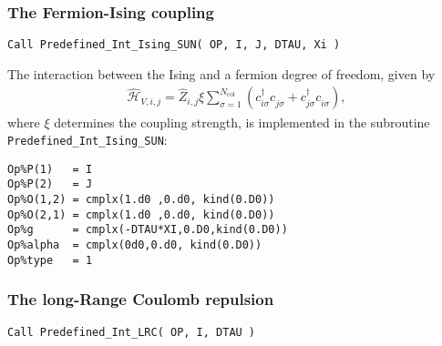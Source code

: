 \subsubsection{The Fermion-Ising coupling}

\begin{lstlisting}[style=fortran]
Call Predefined_Int_Ising_SUN( OP, I, J, DTAU, Xi )
\end{lstlisting}

The interaction between the Ising and a fermion degree of freedom, given by
\begin{align}
\hat{\mathcal{H}}_{V,i,j} =
\hat{Z}_{i,j} \xi  \sum_{\sigma=1}^{N_\mathrm{col}}\left( c^{\dagger}_{i \sigma} c^{\phantom\dagger}_{j \sigma} + c^{\dagger}_{j \sigma} c^{\phantom\dagger}_{i \sigma} \right),
\end{align} 
where $\xi$ determines the coupling strength, is implemented in the subroutine \texttt{Predefined\_Int\_Ising\_SUN}:
\begin{lstlisting}[style=fortran]
Op%P(1)   = I
Op%P(2)   = J
Op%O(1,2) = cmplx(1.d0 ,0.d0, kind(0.D0)) 
Op%O(2,1) = cmplx(1.d0 ,0.d0, kind(0.D0)) 
Op%g      = cmplx(-DTAU*XI,0.D0,kind(0.D0))
Op%alpha  = cmplx(0d0,0.d0, kind(0.D0)) 
Op%type   = 1

\end{lstlisting}



\subsubsection{The long-Range Coulomb repulsion}

\begin{lstlisting}[style=fortran]
Call Predefined_Int_LRC( OP, I, DTAU )
\end{lstlisting}

